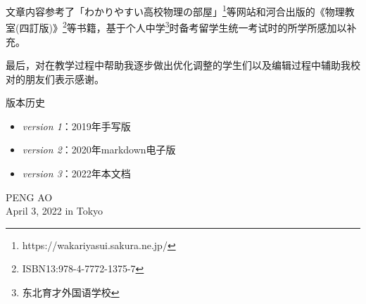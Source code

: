 文章内容参考了「わかりやすい高校物理の部屋」\footnote{https://wakariyasui.sakura.ne.jp/}等网站和河合出版的《物理教室(四訂版)》\footnote{ISBN13:978-4-7772-1375-7}等书籍，基于个人中学\footnote{东北育才外国语学校}时备考留学生统一考试时的所学所感加以补充。

最后，对在教学过程中帮助我逐步做出优化调整的学生们以及编辑过程中辅助我校对的朋友们表示感谢。

\vfill
版本历史
\begin{itemize}
    \item \textit{version 1}：2019年手写版
    \item \textit{version 2}：2020年markdown电子版
    \item \textit{version 3}：2022年本文档
\end{itemize}

\vfill
\begin{flushright}
    PENG AO\\
    April 3, 2022 in Tokyo
\end{flushright}


\tableofcontents

